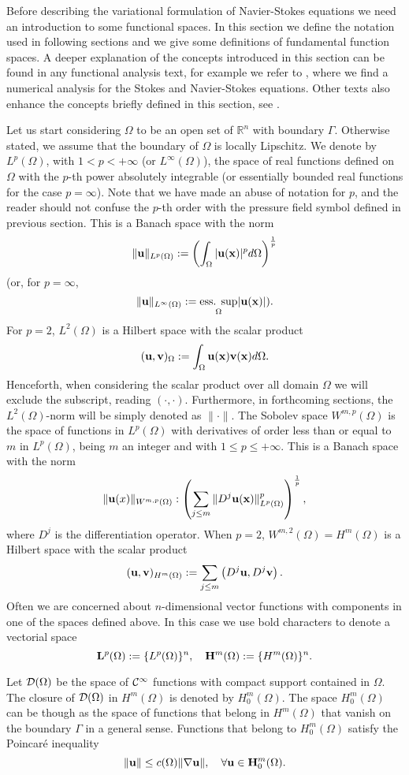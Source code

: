 Before describing the variational formulation of Navier-Stokes equations we need an introduction to some functional spaces. In this section we define the notation used in following sections and we give some definitions of fundamental function spaces. A deeper explanation of the concepts introduced in this section can be found in any functional analysis text, for example we refer to \cite{temam}, where we find a numerical analysis for the Stokes and Navier-Stokes equations. Other texts also enhance the concepts briefly defined in this section, see \cite{brenner}.

Let us start considering $\Omega$ to be an open set of $\mathbb{R}^n$ with boundary $\Gamma$. Otherwise stated, we assume that the boundary of $\Omega$ is locally Lipschitz. We denote by $L^p(\Omega)$, with $1<p<+\infty$ (or $L^\infty(\Omega)$), the space of real functions defined on $\Omega$ with the $p$-th power absolutely integrable (or essentially bounded real functions for the case $p=\infty$). Note that we have made an abuse of notation for $ p $, and the reader should not confuse the $ p $-th order with the pressure field symbol defined in previous section. This is a Banach space with the norm 
$$\|{\bf u}\|_{L^p(\Omega)}:=\left(\int_\Omega|{\bf u}({\bf x})|^pd\Omega\right)^{\frac{1}{p}}$$
(or, for $p=\infty$,
$$\|{\bf u}\|_{L^\infty(\Omega)}:=\underset{\Omega}{\mbox{ess. sup}}|{\bf u}({\bf x})|).$$
For $p=2$, $L^2(\Omega)$ is a Hilbert space with the scalar product
$$({\bf u},{\bf v})_\Omega:=\int_\Omega{\bf u}({\bf x}){\bf v}({\bf x})d\Omega.$$
Henceforth, when considering the scalar product over all domain $\Omega$ we will exclude the subscript, reading $(\cdot,\cdot)$. Furthermore, in forthcoming sections, the $L^2(\Omega)$-norm will be simply denoted as $\|\cdot\|$.
The Sobolev space  $W^{m,p}(\Omega)$ is the space of functions in $L^p(\Omega)$ with derivatives of order less than or equal to $m$ in $L^p(\Omega)$, being $m$ an integer and with $1\leq p\leq+\infty$. This is a Banach space with the norm
$$\|{\bf u}(x)\|_{W^{m,p}(\Omega)}:\left(\sum_{j\leq m}\|D^j{\bf u}({\bf x})\|^p_{L^p(\Omega)}\right)^{\frac{1}{p}},$$
where $D^j$ is the differentiation operator. When $p=2$, $W^{m,2}(\Omega)=H^m(\Omega)$ is a Hilbert space with the scalar product
$$({\bf u},{\bf v})_{H^m(\Omega)}:=\sum_{j\leq m}\left(D^j{\bf u},D^j{\bf v}\right).$$
Often we are concerned about $n$-dimensional vector functions with components in one of the spaces defined above. In this case we use bold characters to denote a vectorial space
$${\bf L}^p(\Omega):=\{L^p(\Omega)\}^n,\quad{\bf H}^m(\Omega):=\{H^m(\Omega)\}^n.$$

Let $\mathcal{D}(\Omega)$ be the space of $\mathcal{C}^\infty$ functions with compact support contained in $\Omega$. The closure of $\mathcal{D}(\Omega)$ in $H^m(\Omega)$ is denoted by $H^m_0(\Omega)$. The space $H^m_0(\Omega)$ can be though as the space of functions that belong in $H^m(\Omega)$ that vanish on the boundary $\Gamma$ in a general sense. Functions that belong to $H^m_0(\Omega)$ satisfy the Poincaré inequality
\begin{equation}
\label{eq-Poincare_inequality}
\|{\bf u}\|\leq c(\Omega)\|\nabla{\bf u}\|,\quad\forall{\bf u}\in{\bf H}^m_0(\Omega).
\end{equation}

